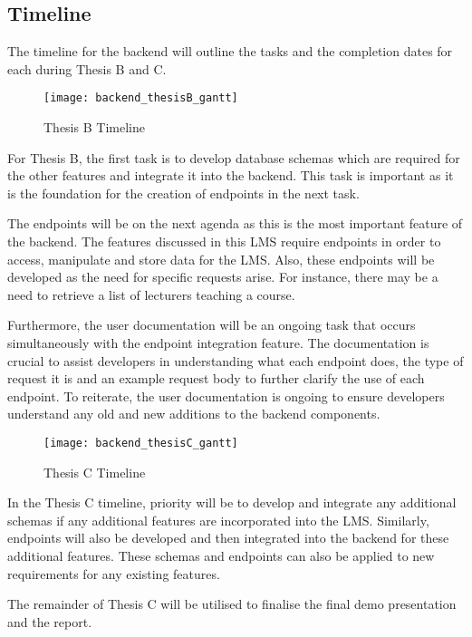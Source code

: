\subsection{Timeline}
The timeline for the backend will outline the tasks and the completion dates for each during Thesis B and C.

\newpage

\begin{figure}[h!]
    \centering
    \texttt{[image: backend\_thesisB\_gantt]}
    \caption{Thesis B Timeline}
\end{figure}

For Thesis B, the first task is to develop database schemas which are required for the other features and integrate 
it into the backend. This task is important as it is the foundation for the creation of endpoints in the next task. 

The endpoints will be on the next agenda as this is the most important feature of the backend. The features discussed 
in this LMS require endpoints in order to access, manipulate and store data for the LMS. Also, these endpoints will be 
developed as the need for specific requests arise. For instance, there may be a need to retrieve a list of lecturers teaching a course.

Furthermore, the user documentation will be an ongoing task that occurs simultaneously with the endpoint integration feature. 
The documentation is crucial to assist developers in understanding what each endpoint does, the type of request it is and an
example request body to further clarify the use of each endpoint. To reiterate, the user documentation is ongoing to ensure 
developers understand any old and new additions to the backend components. 

\begin{figure}[h!]
    \centering
    \texttt{[image: backend\_thesisC\_gantt]}
    \caption{Thesis C Timeline}
\end{figure}

In the Thesis C timeline, priority will be to develop and integrate any additional schemas if any additional features 
are incorporated into the LMS. Similarly, endpoints will also be developed and then integrated into the backend for 
these additional features. These schemas and endpoints can also be applied to new requirements for any existing features. 

The remainder of Thesis C will be utilised to finalise the final demo presentation and the report. 


